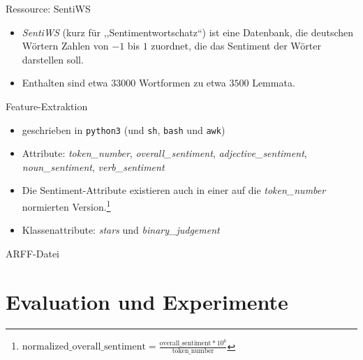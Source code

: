 \documentclass[note=hide]{beamer} %
\newcommand{\proglang}[1]{\texttt{#1}}
\newcommand{\feature}[1]{\textcolor{dunkelrot}{\emph{#1}}}
\newcommand{\checkthis}[1]{#1}
\begin{document}
\begin{frame}{Ressource: SentiWS}
	\begin{itemize}
		\item \emph{SentiWS} (kurz für ,,Sentimentwortschatz``) ist eine Datenbank, die deutschen Wörtern Zahlen von $-1$ bis $1$ zuordnet, die das \checkthis{Sentiment} der Wörter darstellen soll.
		\item Enthalten sind etwa $33000$ Wortformen zu etwa $3500$ Lemmata.
	\end{itemize}
	{
		
	}
\end{frame}

\begin{frame}{Feature-Extraktion}
	\begin{itemize}
		\item geschrieben in \proglang{python3} (und \proglang{sh}, \proglang{bash} und \proglang{awk})
		\item Attribute: \feature{token\_number}, \feature{overall\_sentiment}, \feature{adjective\_sentiment}, \feature{noun\_sentiment}, \feature{verb\_sentiment}
		\item Die Sentiment-Attribute existieren auch in einer auf die \feature{token\_number} normierten Version.\footnote{$\text{normalized\_overall\_sentiment} = \frac{\text{overall\_sentiment} * 10^6}{\text{token\_number}}$}
		\item Klassenattribute: \feature{stars} und \feature{binary\_judgement}
	\end{itemize}
	
\end{frame}

\begin{frame}{ARFF-Datei}
	
\end{frame}

\section{Evaluation und Experimente}
\end{document}
